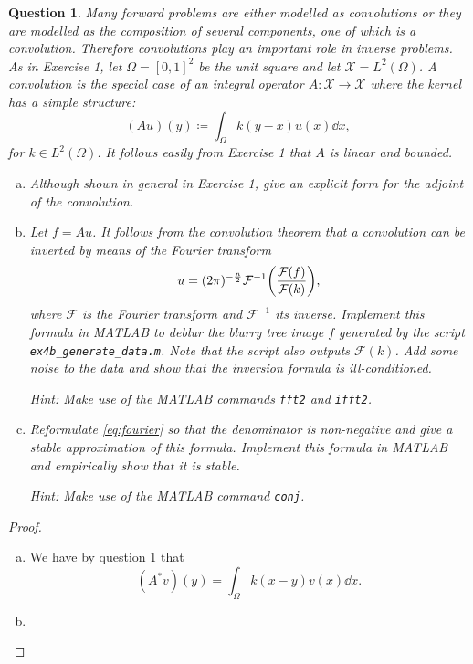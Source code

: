 \documentclass{article}
\theoremstyle{plain}
\newtheorem{question}{Question}
\theoremstyle{remark}
\newcommand{\Cal}{\mathcal}
\newcommand\FF{\Cal F}
\newcommand\ceq\coloneqq %
\newcommand\XX{\Cal X}
\begin{document}
\begin{question}
	Many forward problems are either modelled as convolutions or they are modelled as the composition of several components, one of which is a convolution. Therefore convolutions play an important role in inverse problems. As in Exercise 1, let $\Omega =[0, 1]^2$ be the unit square and let $\XX = L^2(\Omega)$. A convolution is the special case of an integral operator $A \colon \XX \to \XX$ where the kernel has a simple structure: 
	\[
	(Au)(y) \ceq \int_\Omega k(y - x) u(x) \dd{x},
	\]
	for $k \in L^2(\Omega)$. It follows easily from Exercise 1 that $A$ is linear and bounded. 
	\begin{enumerate}[(a)]
		\item Although shown in general in Exercise 1, give an explicit form for the adjoint of the convolution. 
		\item Let $f = Au$. It follows from the convolution theorem that a convolution can be inverted by means of the Fourier transform
		\begin{equation} \label{eq:fourier}
		u = (2\pi)^{-\frac n2} \FF^{-1} \qty(\frac{\FF(f)}{\FF(k)}),
		\end{equation}
		where $\FF$ is the Fourier transform and $\FF^{-1}$ its inverse. Implement this formula in \emph{MATLAB} to deblur the blurry tree image $f$ generated by the script \verb|ex4b_generate_data.m|. Note that the script also outputs $\FF(k)$. Add some noise to the data and show that the inversion formula is ill-conditioned.
		
		Hint: Make use of the \emph{MATLAB} commands \verb|fft2| and \verb|ifft2|. 
		
		\item Reformulate \cref{eq:fourier} so that the denominator is non-negative and give a stable approximation of this formula. Implement this formula in MATLAB and empirically show that it is stable.  
		
		Hint: Make use of the \emph{MATLAB} command \verb|conj|. 
	\end{enumerate}
\end{question}

\begin{proof}
	\begin{enumerate}[(a)]
		\item We have by question 1 that
		\[
		(A^* v)(y) = \int_\Omega k(x - y)v(x) \dd{x}.
		\]
		\item 
	\end{enumerate}
\end{proof}
\end{document}
